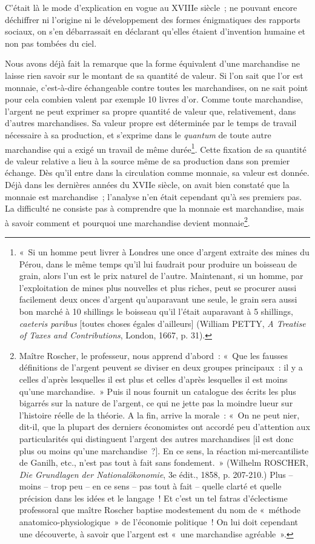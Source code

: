 \documentclass[french,twoside]{book} %
\begin{document}
C’était là le mode d’explication en vogue au XVIIIe siècle ; ne pouvant encore déchiffrer ni l’origine ni le développement des formes énigmatiques des rapports sociaux, on s’en débarrassait en déclarant qu’elles étaient d’invention humaine et non pas tombées du ciel.\par
Nous avons déjà fait la remarque que la forme équivalent d’une marchandise ne laisse rien savoir sur le montant de sa quantité de valeur. Si l’on sait que l’or est monnaie, c’est-à-dire échangeable contre toutes les marchandises, on ne sait point pour cela combien valent par exemple 10 livres d’or. Comme toute marchandise, l’argent ne peut exprimer sa propre quantité de valeur que, relativement, dans d’autres marchandises. Sa valeur propre est déterminée par le temps de travail nécessaire à sa production, et s’exprime dans le \emph{quantum} de toute autre marchandise qui a exigé un travail de même durée\footnote{« Si un homme peut livrer à Londres une once d’argent extraite des mines du Pérou, dans le même temps qu’il lui faudrait pour produire un boisseau de grain, alors l’un est le prix naturel de l’autre. Maintenant, si un homme, par l’exploitation de mines plus nouvelles et plus riches, peut se procurer aussi facilement deux onces d’argent qu’auparavant une seule, le grain sera aussi bon marché à 10 shillings le boisseau qu’il l’était auparavant à 5 shillings, \emph{caeteris paribus} [toutes choses égales d’ailleurs] (William PETTY, \emph{A Treatise of Taxes and Contributions}, London, 1667, p. 31).}. Cette fixation de sa quantité de valeur relative a lieu à la source même de sa production dans son premier échange. Dès qu’il entre dans la circulation comme monnaie, sa valeur est donnée. Déjà dans les dernières années du XVIIe siècle, on avait bien constaté que la monnaie est marchandise ; l’analyse n’en était cependant qu’à ses premiers pas. La difficulté ne consiste pas à comprendre que la monnaie est marchandise, mais à savoir comment et pourquoi une marchandise devient monnaie\footnote{Maître Roscher, le professeur, nous apprend d’abord : « Que les fausses définitions de l’argent peuvent se diviser en deux groupes principaux : il y a celles d’après lesquelles il est plus et celles d’après lesquelles il est moins qu’une marchandise. » Puis il nous fournit un catalogue des écrits les plus bigarrés sur la nature de l’argent, ce qui ne jette pas la moindre lueur sur l’histoire réelle de la théorie. A la fin, arrive la morale : « On ne peut nier, dit-il, que la plupart des derniers économistes ont accordé peu d’attention aux particularités qui distinguent l’argent des autres marchandises [il est donc plus ou moins qu’une marchandise ?]. En ce sens, la réaction mi-mercantiliste de Ganilh, etc., n’est pas tout à fait sans fondement. » (Wilhelm ROSCHER, \emph{Die Grundlagen der Nationalökonomie}, 3e édit., 1858, p. 207-210.) Plus – moins – trop peu – en ce sens – pas tout à fait – quelle clarté et quelle précision dans les idées et le langage ! Et c’est un tel fatras d’éclectisme professoral que maître Roscher baptise modestement du nom de « méthode anatomico-physiologique » de l’économie politique ! On lui doit cependant une découverte, à savoir que l’argent est « une marchandise agréable ».}.\par
\end{document}

